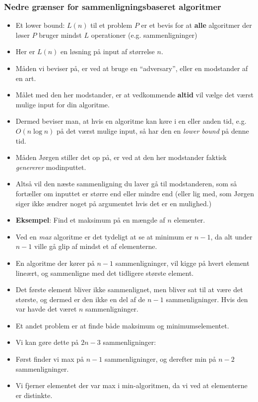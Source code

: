 \begin{frame}[allowframebreaks]
	\frametitle{Nedre grænser for sammenligningsbaseret algoritmer}
	\begin{itemize}
		\item Et lower bound: $L(n)$ til et problem $P$ er et bevis for at \textbf{alle} algoritmer der løser $P$ bruger mindst $L$ operationer (e.g. sammenligninger)
		\item Her er $L(n)$ en løsning på input af størrelse $n$.
		\item Måden vi beviser på, er ved at bruge en ``adversary'', eller en modstander af en art.
		\item Målet med den her modstander, er at vedkommende \textbf{altid} vil vælge det værst mulige input for din algoritme.
		\item Dermed beviser man, at hvis en algoritme kan køre i en eller anden tid, e.g. $O(n \log n)$ på det værst mulige input, så har den en \textit{lower bound} på denne tid.
		\item Måden Jørgen stiller det op på, er ved at den her modstander faktisk \textit{genererer} modinputtet.
		\item Altså vil den næste sammenligning du laver gå til modstanderen, som så fortæller om inputtet er større end eller mindre end (eller lig med, som Jørgen siger ikke ændrer noget på argumentet hvis det er en mulighed.)
		\item \textbf{Eksempel}: Find et maksimum på en mængde af $n$ elementer.
		\item Ved en \textit{max} algoritme er det tydeligt at se at minimum er $n-1$, da alt under $n-1$ ville gå glip af mindst et af elementerne.
		\item En algoritme der kører på $n-1$ sammenligninger, vil kigge på hvert element lineært, og sammenligne med det tidligere største element.
		\item Det første element bliver ikke sammenlignet, men bliver sat til at være det største, og dermed er den ikke en del af de $n-1$ sammenligninger. Hvis den var havde det været $n$
		      sammenligninger.
		\item Et andet problem er at finde både maksimum og minimumselementet.
		\item Vi kan gøre dette på $2n-3$ sammenligninger:
		\item Først finder vi max på $n-1$ sammenligninger, og derefter min på $n-2$ sammenligninger.
		\item Vi fjerner elementet der var max i min-algoritmen, da vi ved at elementerne er distinkte.

\end{itemize}
\end{frame}
